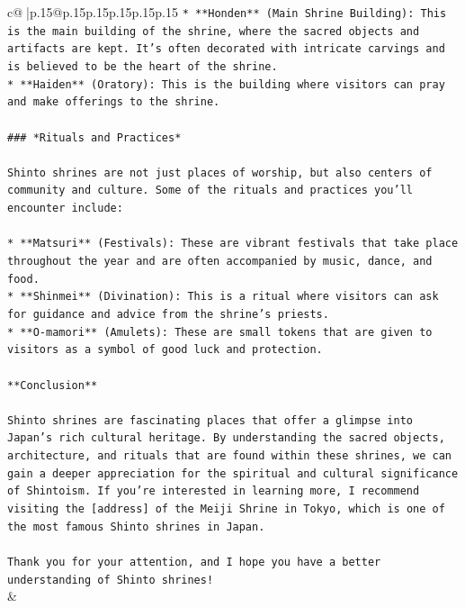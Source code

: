 \documentclass{article}
\begin{document}
{\begin{supertabular}{c@{$\;$}|p{.15\linewidth}@{}p{.15\linewidth}p{.15\linewidth}p{.15\linewidth}p{.15\linewidth}p{.15\linewidth}}
{{{\texttt{* **Honden** (Main Shrine Building): This is the main building of the shrine, where the sacred objects and artifacts are kept. It's often decorated with intricate carvings and is believed to be the heart of the shrine.} \\
\texttt{* **Haiden** (Oratory): This is the building where visitors can pray and make offerings to the shrine.} \\
\\ 
\texttt{\#\#\# *Rituals and Practices*} \\
\\ 
\texttt{Shinto shrines are not just places of worship, but also centers of community and culture. Some of the rituals and practices you'll encounter include:} \\
\\ 
\texttt{* **Matsuri** (Festivals): These are vibrant festivals that take place throughout the year and are often accompanied by music, dance, and food.} \\
\texttt{* **Shinmei** (Divination): This is a ritual where visitors can ask for guidance and advice from the shrine's priests.} \\
\texttt{* **O{-}mamori** (Amulets): These are small tokens that are given to visitors as a symbol of good luck and protection.} \\
\\ 
\texttt{**Conclusion**} \\
\\ 
\texttt{Shinto shrines are fascinating places that offer a glimpse into Japan's rich cultural heritage. By understanding the sacred objects, architecture, and rituals that are found within these shrines, we can gain a deeper appreciation for the spiritual and cultural significance of Shintoism. If you're interested in learning more, I recommend visiting the {[}address{]} of the Meiji Shrine in Tokyo, which is one of the most famous Shinto shrines in Japan.} \\
\\ 
\texttt{Thank you for your attention, and I hope you have a better understanding of Shinto shrines!} \\
            }
        }
    }
    & \\ \\


\end{supertabular}}
\end{document}
